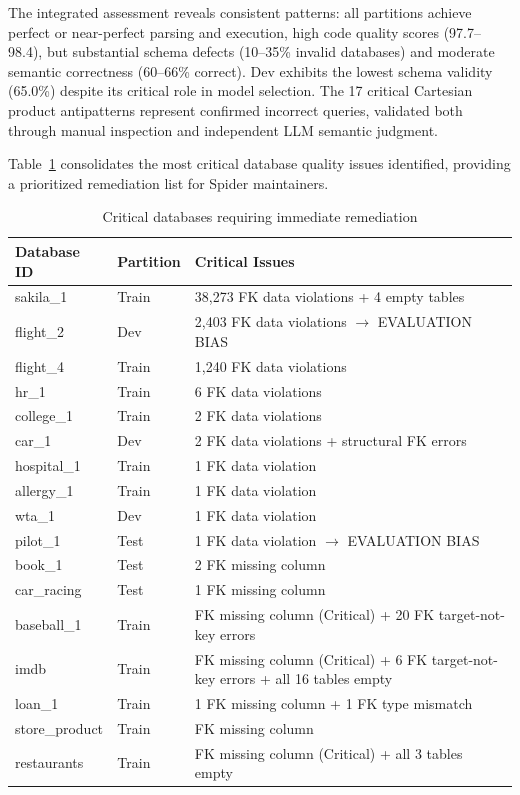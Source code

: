 \documentclass[]{einformatica}
\begin{document}
The integrated assessment reveals consistent patterns: all partitions achieve perfect or near-perfect parsing and execution, high code quality scores (97.7--98.4), but substantial schema defects (10--35\% invalid databases) and moderate semantic correctness (60--66\% correct). Dev exhibits the lowest schema validity (65.0\%) despite its critical role in model selection. The 17 critical Cartesian product antipatterns represent confirmed incorrect queries, validated both through manual inspection and independent LLM semantic judgment.

Table~\ref{tab:critical_dbs} consolidates the most critical database quality issues identified, providing a prioritized remediation list for Spider maintainers.

\begin{table}[ht]
    \caption{Critical databases requiring immediate remediation}
    \label{tab:critical_dbs}
    \centering
    \footnotesize
    \begin{tabular}{llp{}}
        \toprule
        \textbf{Database ID} & \textbf{Partition} & \textbf{Critical Issues} \\
        \midrule
        sakila\_1 & Train & 38,273 FK data violations + 4 empty tables \\
        flight\_2 & Dev & 2,403 FK data violations $\rightarrow$ EVALUATION BIAS \\
        flight\_4 & Train & 1,240 FK data violations \\
        hr\_1 & Train & 6 FK data violations \\
        college\_1 & Train & 2 FK data violations \\
        car\_1 & Dev & 2 FK data violations + structural FK errors \\
        hospital\_1 & Train & 1 FK data violation \\
        allergy\_1 & Train & 1 FK data violation \\
        wta\_1 & Dev & 1 FK data violation \\
        pilot\_1 & Test & 1 FK data violation $\rightarrow$ EVALUATION BIAS \\
        book\_1 & Test & 2 FK missing column \\
        car\_racing & Test & 1 FK missing column \\
        baseball\_1 & Train & FK missing column (Critical) + 20 FK target-not-key errors \\
        imdb & Train & FK missing column (Critical) + 6 FK target-not-key errors + all 16 tables empty \\
        loan\_1 & Train & 1 FK missing column + 1 FK type mismatch \\
        store\_product & Train & FK missing column \\
        restaurants & Train & FK missing column (Critical) + all 3 tables empty \\
        \bottomrule
    \end{tabular}
\end{table}
\end{document}
